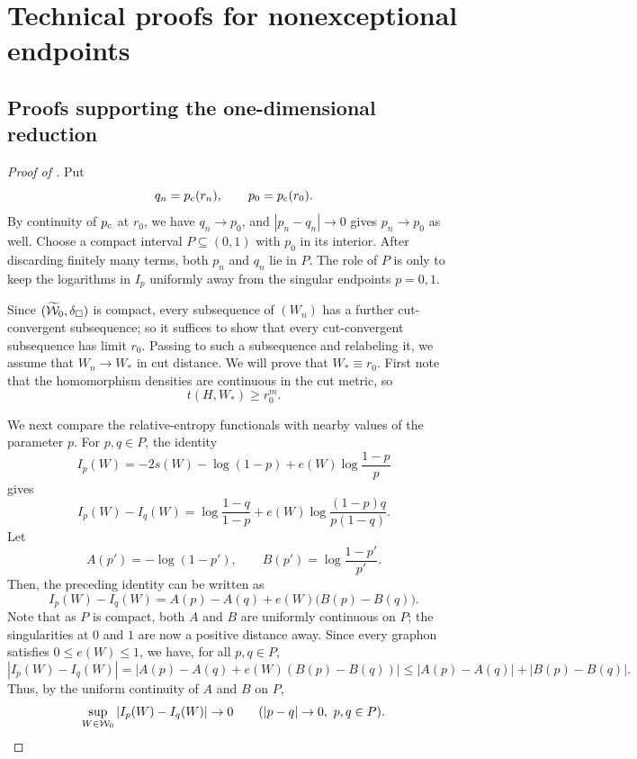 \section{Technical proofs for nonexceptional endpoints}
\label{app:nonexceptional-proofs}

\subsection{Proofs supporting the one-dimensional reduction}
\label{app:local-reduction}

\begin{proof}[Proof of ]
Put
\[
  q_n=p_{\mathrm c}(r_n),
  \qquad
  p_0=p_{\mathrm c}(r_0).
\]
By continuity of $p_{\mathrm c}$ at $r_0$, we have $q_n\to p_0$, and
$|p_n-q_n|\to0$ gives $p_n\to p_0$ as well.
Choose a compact interval $P\subseteq(0,1)$ with $p_0$ in its interior.
After discarding finitely many terms, both $p_n$ and $q_n$ lie in $P$.
The role of $P$ is only to keep the logarithms in $I_p$ uniformly away from the
singular endpoints $p=0,1$.

Since $(\widetilde{\mathcal W}_0,\delta_\square)$ is compact, every subsequence of
$(W_n)$ has a further cut-convergent subsequence; so it suffices to show that
every cut-convergent subsequence has limit $r_0$.
Passing to such a subsequence and relabeling it, we assume that $W_n\to W_*$ in cut distance.
We will prove that $W_*\equiv r_0$.
First note that the homomorphism densities
are continuous in the cut metric, so
\begin{equation}
  \label{eq:boundary-limit-feasibility}
  t(H,W_*)\ge r_0^m.
\end{equation}

We next compare the relative-entropy functionals with nearby values of the
parameter $p$.  For $p,q\in P$, the identity
\[
  I_p(W)
  =
  -2s(W)-\log(1-p)+e(W)\log\frac{1-p}{p}
\]
gives
\[
  I_p(W)-I_q(W)
  =
  \log\frac{1-q}{1-p}
  +e(W)\log\frac{(1-p)q}{p(1-q)}.
\]
Let
\[
  A(p')=-\log(1-p'),
  \qquad
  B(p')=\log\frac{1-p'}{p'}.
\]
Then, the preceding identity can be written as
\[
  I_p(W)-I_q(W)=A(p)-A(q)+e(W)\bigl(B(p)-B(q)\bigr).
\]
Note that as $P$ is compact, both $A$ and $B$
are uniformly continuous on $P$; the singularities at $0$ and $1$ are now a
positive distance away.
Since every graphon satisfies
$0\le e(W)\le1$, we have, for all $p,q\in P$,
\[
  |I_p(W)-I_q(W)| = |A(p)-A(q)+e(W)(B(p)-B(q))|
  \le |A(p)-A(q)| + |B(p)-B(q)|.
\]
Thus, by the uniform continuity of $A$ and $B$ on $P$,
\begin{equation}\label{eq:entropy-parameter-continuity}
\sup_{W\in\mathcal W_0}|I_p(W)-I_q(W)|\to0
\qquad (|p-q|\to0,\ p,q\in P).
\end{equation}



\end{proof}
